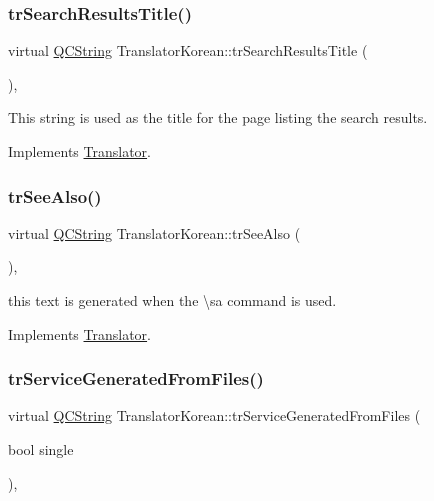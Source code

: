 \subsubsection{\texorpdfstring{trSearchResultsTitle()}{trSearchResultsTitle()}}
{\footnotesize\ttfamily virtual \mbox{\hyperlink{class_q_c_string}{Q\+C\+String}} Translator\+Korean\+::tr\+Search\+Results\+Title (\begin{DoxyParamCaption}{ }\end{DoxyParamCaption})\hspace{0.3cm}{\ttfamily [inline]}, {\ttfamily [virtual]}}

This string is used as the title for the page listing the search results. 

Implements \mbox{\hyperlink{class_translator}{Translator}}.

\mbox{\label{class_translator_korean_a1b5025112fd90610ece7596edf0ae5c2}} 
\subsubsection{\texorpdfstring{trSeeAlso()}{trSeeAlso()}}
{\footnotesize\ttfamily virtual \mbox{\hyperlink{class_q_c_string}{Q\+C\+String}} Translator\+Korean\+::tr\+See\+Also (\begin{DoxyParamCaption}{ }\end{DoxyParamCaption})\hspace{0.3cm}{\ttfamily [inline]}, {\ttfamily [virtual]}}

this text is generated when the \textbackslash{}sa command is used. 

Implements \mbox{\hyperlink{class_translator}{Translator}}.

\mbox{\label{class_translator_korean_aedacbfa496ebf67af407c473633a9b93}} 
\subsubsection{\texorpdfstring{trServiceGeneratedFromFiles()}{trServiceGeneratedFromFiles()}}
{\footnotesize\ttfamily virtual \mbox{\hyperlink{class_q_c_string}{Q\+C\+String}} Translator\+Korean\+::tr\+Service\+Generated\+From\+Files (\begin{DoxyParamCaption}\item[{bool}]{single }\end{DoxyParamCaption})\hspace{0.3cm}{\ttfamily [inline]}, {\ttfamily [virtual]}}

